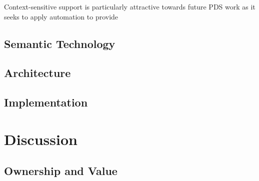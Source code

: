 \documentclass[runningheads,a4paper]{llncs}
\begin{document}
Context-sensitive support is particularly attractive towards future PDS work as it seeks to apply automation to provide

\subsection{Semantic Technology}






\subsection{Architecture}

\subsection{Implementation}

\section{Discussion}

\subsection{Ownership and Value}
\end{document}
